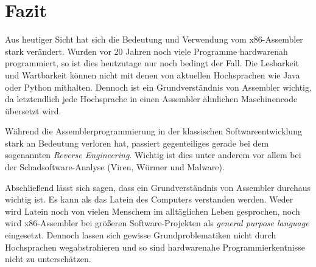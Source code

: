 \section{Fazit}
Aus heutiger Sicht hat sich die Bedeutung und Verwendung vom x86-Assembler stark verändert.
Wurden vor 20 Jahren noch viele Programme hardwarenah programmiert, so ist dies heutzutage nur noch bedingt der Fall.
Die Lesbarkeit und Wartbarkeit können nicht mit denen von aktuellen Hochsprachen wie Java oder Python mithalten.
Dennoch ist ein Grundverständnis von Assembler wichtig, da letztendlich jede Hochsprache in einen Assembler ähnlichen Maschinencode übersetzt wird.

Während die Assemblerprogrammierung in der klassischen Softwareentwicklung stark an Bedeutung verloren hat, passiert gegenteiliges gerade bei dem sogenannten \textit{Reverse Engineering}.
Wichtig ist dies unter anderem vor allem bei der Schadsoftware-Analyse (Viren, Würmer und Malware).

Abschließend lässt sich sagen, dass ein Grundverständnis von Assembler durchaus wichtig ist.
Es kann als das Latein des Computers verstanden werden.
Weder wird Latein noch von vielen Menschem im alltäglichen Leben gesprochen, noch wird x86-Assembler bei größeren Software-Projekten als \textit{general purpose language} eingesetzt.
Dennoch lassen sich gewisse Grundproblematiken nicht durch Hochsprachen wegabstrahieren und so sind hardwarenahe Programmierkentnisse nicht zu unterschätzen.
